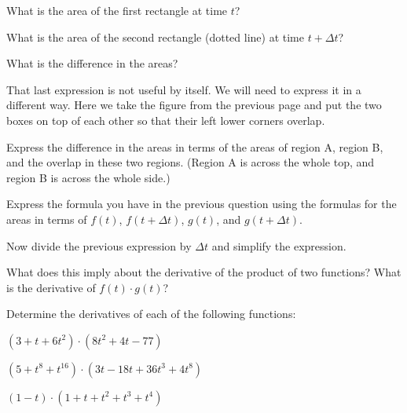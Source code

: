 \begin{problem}
  \scalebox{0.55}{}

  \begin{subproblem}
  \item What is the area of the first rectangle at time $t$?
    \vfill
  \item What is the area of the second rectangle (dotted line) at time $t+\Delta t$?
    \vfill
  \item What is the difference in the areas?
    \vfill
  \end{subproblem}

  \clearpage

\item That last expression is not useful by itself. We will need to
  express it in a different way. Here we take the figure from the
  previous page and put the two boxes on top of each other so that
  their left lower corners overlap.

  \scalebox{0.55}{}

  \begin{subproblem}
    \item Express the difference in the areas in terms of the areas of
      region A, region B, and the overlap in these two
      regions. (Region A is across the whole top, and region B is
      across the whole side.)
      \vfill

    \item Express the formula you have in the previous question using
      the formulas for the areas in terms of $f(t)$, $f(t+\Delta t)$,
      $g(t)$, and $g(t+\Delta t)$.
      \vfill

    \item Now divide the previous expression by $\Delta t$ and
      simplify the expression.
      \vfill

  \end{subproblem}

  \clearpage

\item What does this imply about the derivative of the product of two
  functions? What is the derivative of $f(t)\cdot g(t)$?
  \vfill

\item Determine the derivatives of each of the following functions:
  \begin{subproblem}
  \item $(3+t+6t^2) \cdot (8t^2+4t-77)$
    \vfill
  \item $(5+t^8+t^{16}) \cdot (3t-18t+36t^3+4t^8)$
    \vfill
  \item $(1-t) \cdot (1+t+t^2+t^3+t^4)$
    \vfill
  \end{subproblem}
  

\end{problem}

